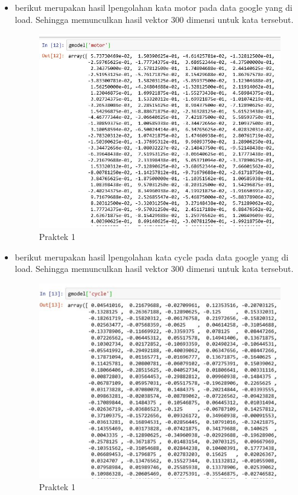 \begin{enumerate}
\begin{itemize}
\item berikut merupakan hasil lpengolahan kata motor pada data google yang di load. Sehingga memunculkan hasil vektor 300 dimensi untuk kata tersebut. 

\begin{figure}[ht]
\centering
\includegraphics[scale=0.6]{figures/1174008/5/2,1,10.PNG}
\caption{Praktek 1}
\end{figure}

\item berikut merupakan hasil lpengolahan kata cycle pada data google yang di load. Sehingga memunculkan hasil vektor 300 dimensi untuk kata tersebut. 

\begin{figure}[ht]
\centering
\includegraphics[scale=0.6]{figures/1174008/5/2,1,11.PNG}
\caption{Praktek 1}
\end{figure}


\end{itemize}
\end{enumerate}

